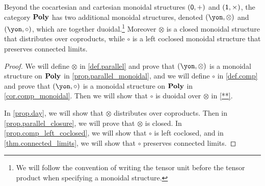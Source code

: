 \documentclass[Book-Poly]{subfiles}
\begin{document}
\begin{proposition}
Beyond the cocartesian and cartesian monoidal structures $(\textsf{0},+)$ and $(\textsf{1},\times)$, the category $\mathbf{Poly}$ has two additional monoidal structures, denoted $(\yon,\otimes)$ and $(\yon,\circ)$, which are together duoidal.\footnote{We will follow the convention of writing the tensor unit before the tensor product when specifying a monoidal structure.} Moreover $\otimes$ is a closed monoidal structure that distributes over coproducts, while $\circ$ is a left coclosed monoidal structure that preserves connected limits.
\end{proposition}
\begin{proof}
We will define $\otimes$ in \cref{def.parallel} and prove that $(\yon, \otimes)$ is a monoidal structure on $\mathbf{Poly}$ in \cref{prop.parallel_monoidal}, and we will define $\circ$ in \cref{def.comp} and prove that $(\yon, \circ)$ is a monoidal structure on $\mathbf{Poly}$ in \cref{cor.comp_monoidal}.
Then we will show that $\circ$ is duoidal over $\otimes$ in \cref{**}.

In \cref{prop.day}, we will show that $\otimes$ distributes over coproducts.
Then in \cref{prop.parallel_closure}, we will prove that $\otimes$ is closed.
In \cref{prop.comp_left_coclosed}, we will show that $\circ$ is left coclosed, and in \cref{thm.connected_limits}, we will show that $\circ$ preserves connected limits.
\end{proof}
\end{document}
